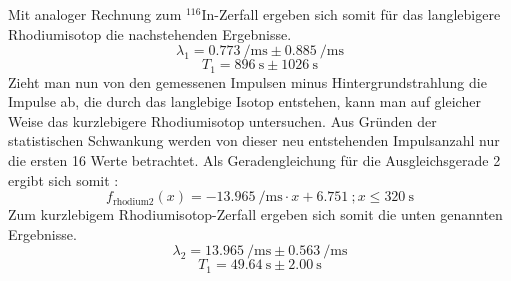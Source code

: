 %
Mit analoger Rechnung zum ${}^{116}$In-Zerfall ergeben sich somit für das langlebigere Rhodiumisotop die nachstehenden Ergebnisse.
%
\begin{equation*}
\lambda_1 = \SI{0.773}{\per\milli\second} \pm   \SI{0.885}{\per\milli\second}
\end{equation*}
% 
\begin{equation*}
T_1 = \SI{896}{\second} \pm   \SI{1026}{\second}
\end{equation*}
%
Zieht man nun von den gemessenen Impulsen minus Hintergrundstrahlung die Impulse ab, die durch das langlebige Isotop entstehen, kann man auf gleicher Weise das kurzlebigere Rhodiumisotop untersuchen.
Aus Gründen der statistischen Schwankung werden von dieser neu entstehenden Impulsanzahl nur die ersten 16 Werte betrachtet.
Als Geradengleichung für die Ausgleichsgerade 2 ergibt sich somit :
\begin{equation*}
f_{\text{rhodium2}}(x) = \SI{-13.965}{\per\milli\second} \cdot x + \SI{6.751}{} ; x \le \SI{320}{\second}
\end{equation*}
Zum kurzlebigem Rhodiumisotop-Zerfall ergeben sich somit die unten genannten Ergebnisse.
%
\begin{equation*}
\lambda_2 = \SI{13.965}{\per\milli\second} \pm   \SI{0.563}{\per\milli\second}
\end{equation*}
% 
\begin{equation*}
T_1 = \SI{49.64}{\second} \pm   \SI{2.00}{\second}
\end{equation*}
%